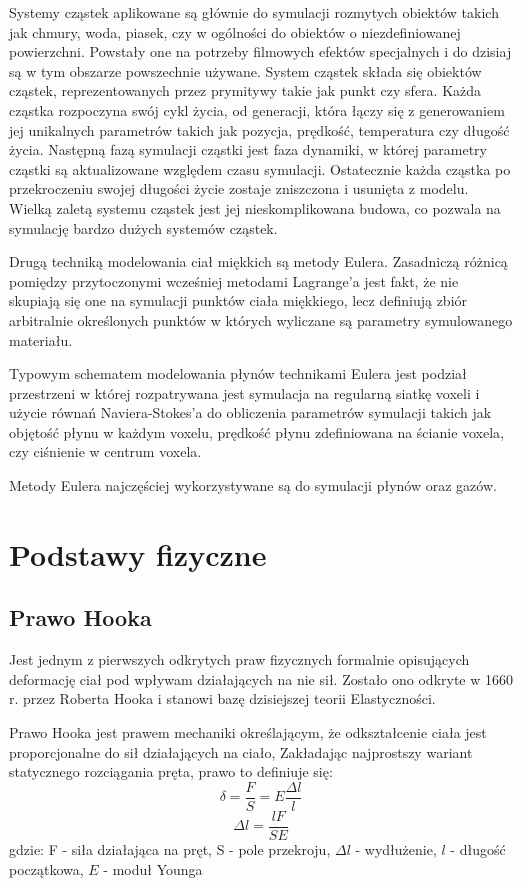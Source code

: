 Systemy cząstek aplikowane są głównie do symulacji rozmytych obiektów takich jak
chmury, woda, piasek, czy w ogólności do obiektów o niezdefiniowanej
powierzchni. Powstały one na potrzeby filmowych efektów specjalnych i do dzisiaj
są w tym obszarze powszechnie używane. System cząstek składa się obiektów cząstek,
reprezentowanych przez prymitywy takie jak punkt czy sfera. Każda cząstka
rozpoczyna swój cykl życia, od generacji, która łączy się z generowaniem 
jej unikalnych parametrów takich jak pozycja, prędkość, temperatura czy długość życia.
Następną fazą symulacji cząstki jest faza dynamiki, w której parametry cząstki
są aktualizowane względem czasu symulacji. Ostatecznie każda cząstka po
przekroczeniu swojej długości życie zostaje zniszczona i usunięta z modelu.
Wielką zaletą systemu cząstek jest jej nieskomplikowana budowa, co pozwala na
symulację bardzo dużych systemów cząstek. 

Drugą techniką modelowania ciał miękkich są metody Eulera. Zasadniczą różnicą
pomiędzy przytoczonymi wcześniej metodami Lagrange'a jest fakt, że nie skupiają 
się one na symulacji punktów ciała miękkiego, lecz definiują zbiór arbitralnie
określonych punktów w których wyliczane są parametry symulowanego materiału.

Typowym schematem modelowania płynów technikami Eulera jest podział przestrzeni w
której rozpatrywana jest symulacja na regularną siatkę voxeli i użycie równań Naviera-Stokes'a do
obliczenia parametrów symulacji takich jak objętość płynu w każdym voxelu,
 prędkość płynu zdefiniowana na ścianie voxela, czy ciśnienie w centrum voxela.

Metody Eulera najczęściej wykorzystywane są do symulacji płynów oraz gazów.

\section{Podstawy fizyczne}
\subsection{Prawo Hooka}
Jest jednym z pierwszych odkrytych praw fizycznych formalnie opisujących deformację ciał pod wpływam
działających na nie sił. Zostało ono odkryte w 1660 r. przez Roberta Hooka i 
stanowi bazę dzisiejszej teorii Elastyczności\cite{elast}.

Prawo Hooka jest prawem mechaniki określającym, że odkształcenie ciała jest
proporcjonalne do sił działających na ciało,
Zakładając najprostszy wariant statycznego rozciągania pręta, prawo to definiuje
się:
$$\delta = \frac{F}{S} = E\frac{\Delta l}{l}$$
$$\Delta l = \frac{lF}{SE}$$
gdzie:
F - siła działająca na pręt,
S - pole przekroju,
$\Delta l$ - wydłużenie,
$l$ - długość początkowa,
$E$ - moduł Younga

